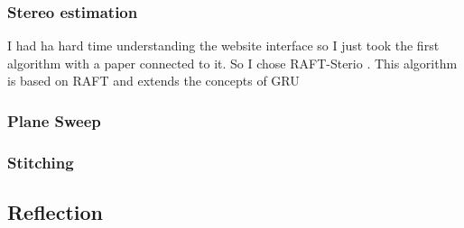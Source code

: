 \documentclass{article}
\begin{document}
    \subsubsection{Stereo estimation}
    I had ha hard time understanding the website interface so I just took the first
    algorithm with a paper connected to it. So I chose RAFT-Sterio \cite{lipson2021raft}.
    This algorithm is based on RAFT \cite{teed2020raft} and extends the concepts of GRU
    \subsubsection{Plane Sweep}
    \subsubsection{Stitching}
    \subsection{Reflection}
    
    \newpage
    \printbibliography
\end{document}
